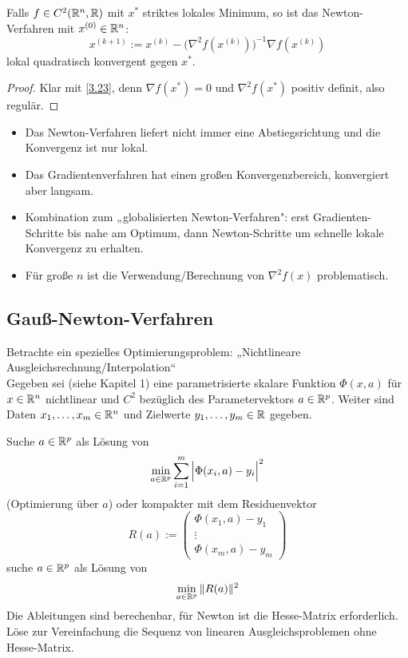 \documentclass[
]{mycourse}
\begin{document}
\begin{kor} \label{4.26}
	Falls $f \in C^2 (\mathbb{R}^n, \mathbb{R})$ mit $x^*$ striktes lokales Minimum, so ist das Newton-Verfahren mit $x^{(0)} \in \mathbb{R}^n$:
	\[
		x^{(k+1)} := x^{(k)} - \Big( \nabla^2 f(x^{(k)}) \Big)^{-1} \nabla f(x^{(k)})
	\]
	lokal quadratisch konvergent gegen $x^*$.
	\begin{proof}
		Klar mit \ref{3.23}, denn $\nabla f(x^*) = 0$ und $\nabla^2 f(x^*)$ positiv definit, also regulär.
	\end{proof}
	\begin{note}
		\begin{itemize}
			\item
				Das Newton-Verfahren liefert nicht immer eine Abstiegsrichtung und die Konvergenz ist nur lokal.
			\item
				Das Gradientenverfahren hat einen großen Konvergenzbereich, konvergiert aber langsam.
			\item
				Kombination zum „globalisierten Newton-Verfahren": erst Gradienten-Schritte bis nahe am Optimum, dann Newton-Schritte um schnelle lokale Konvergenz zu erhalten.
			\item
				Für große $n$ ist die Verwendung/Berechnung von $\nabla^2 f(x)$  problematisch.
		\end{itemize}
	\end{note}
\end{kor}


\subsection{Gauß-Newton-Verfahren}


Betrachte ein spezielles Optimierungsproblem: „Nichtlineare Ausgleichsrechnung/Interpolation“ \\
Gegeben sei (siehe Kapitel 1) eine parametrisierte skalare Funktion $\Phi(x, a)$  für $x \in \mathbb{R}^n$ nichtlinear und $C^2$ bezüglich des Parametervektors $a \in \mathbb{R}^p$.
Weiter sind Daten $x_1, \dotsc, x_m \in \mathbb{R}^n$ und Zielwerte $y_1, \dotsc, y_m \in \mathbb{R}$ gegeben.

Suche $a \in \mathbb{R}^p$ als Lösung von
\[
	\min_{a \in \mathbb{R}^p} \sum_{i=1}^m \Big| \Phi(x_i,a) - y_i \Big|^2
\]
(Optimierung über $a$)
oder kompakter mit dem Residuenvektor
\[
	R(a) := \begin{pmatrix}
		\Phi(x_1,a) - y_1 \\
		\vdots \\
		\Phi(x_m, a) - y_m
	\end{pmatrix}
\]
suche $a \in \mathbb{R}^p$ als Lösung von
\[
	\min_{a \in \mathbb{R}^p} \|R(a)\|^2
\]
Die Ableitungen sind berechenbar, für Newton ist die Hesse-Matrix erforderlich.
Löse zur Vereinfachung die Sequenz von linearen Ausgleichsproblemen ohne Hesse-Matrix.
\end{document}
